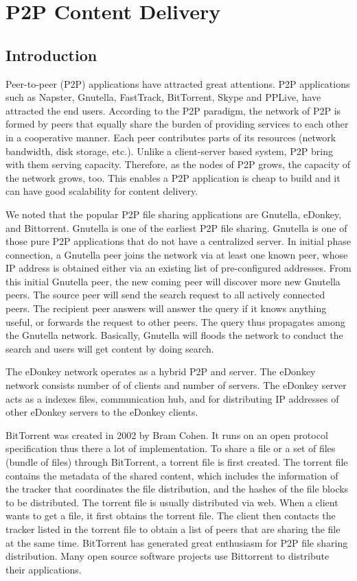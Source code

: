 \chapter{P2P Content Delivery}
\section{Introduction}

Peer-to-peer (P2P) applications have attracted great attentions.
P2P applications such as Napster, Gnutella, FastTrack, BitTorrent, Skype and PPLive, have attracted the end users.
According to the P2P paradigm, the network of P2P is formed by peers that equally share the burden of providing services to each other in a cooperative manner.
Each peer contributes parts of its resources (network bandwidth, disk storage, etc.).
Unlike a client-server based system, P2P bring with them serving capacity. 
Therefore, as the nodes of P2P grows, the capacity of the network grows, too. 
This enables a P2P application is cheap to build and it can have good scalability for content delivery.  

We noted that the popular P2P file sharing applications are Gnutella, eDonkey, and Bittorrent.  
Gnutella is one of the earliest P2P file sharing.
Gnutella is one of those pure P2P applications that do not have a centralized server.
In initial phase connection, a Gnutella peer joins the network via at least one known peer, whose IP address is obtained either via an existing list of pre-configured addresses.
From this initial Gnutella peer, the new coming peer will discover more new Gnutella peers.
The source peer will send the search request to all actively connected peers. 
The recipient peer answers will answer the query if it knows anything useful, or forwards the request to other peers.
The query thus propagates among the Gnutella network.
Basically, Gnutella will floods the network to conduct the search and users will get content by doing search.

The eDonkey network operates as a hybrid P2P and server. 
The eDonkey network consists number of of clients and number of servers. 
The eDonkey server acts as a indexes files, communication hub, and for distributing IP addresses of other eDonkey servers to the eDonkey clients.

BitTorrent was created in 2002 by Bram Cohen. 
It runs on an open protocol specification thus there a lot of implementation.
To share a file or a set of files (bundle of files) through BitTorrent, a torrent file is first created. 
The torrent file contains the metadata of the shared content, which includes the information of the tracker that coordinates the file distribution, and the hashes of the file blocks to be distributed. 
The torrent file is usually distributed via web.
When a client wants to get a file, it first obtains the torrent file. 
The client then contacts the tracker listed in the torrent file to obtain a list of peers that are sharing the file at the same time.  
BitTorrent has generated great enthusiasm for P2P file sharing distribution.  
Many open source software projects use Bittorrent to distribute their applications.

